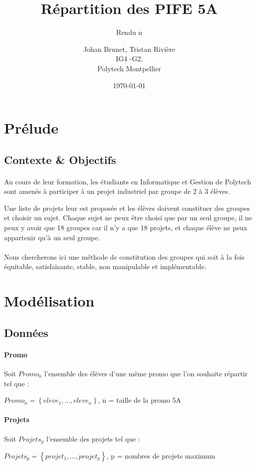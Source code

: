 \documentclass[10pt,a4paper]{scrartcl}
\title{Répartition des PIFE 5A}
\subtitle{Rendu n\degre3}
\author{Johan Brunet, Tristan Rivière\\
   IG4 -G2,\\
   Polytech Montpellier}
\date{\today}
\begin{document}
\maketitle
\section{Prélude}
\subsection{Contexte \& Objectifs}
\paragraph*{}
Au cours de leur formation, les étudiants en Informatique et Gestion de Polytech sont amenés à participer à un projet industriel par groupe de 2 à 3 élèves.

Une liste de projets leur est proposée et les élèves doivent constituer des groupes et choisir un sujet. Chaque sujet ne peux être choisi que par un seul groupe, il ne peux y avoir que 18 groupes car il n'y a que 18 projets, et chaque élève ne peux appartenir qu'à un seul groupe.
\paragraph*{}
Nous chercherons ici une méthode de constitution des groupes qui soit à la fois équitable, satisfaisante, stable, non manipulable et implémentable.

\section{Modélisation}
\subsection{Données}
\paragraph{Promo}Soit $Promo_{n}$ l'ensemble des élèves d'une même promo que l'on souhaite répartir tel que : \\
\begin{center}
	$Promo_{n}=\left\{ eleve_{1}, ..., eleve_{n} \right\}$, n = taille de la promo 5A
\end{center}
\paragraph{Projets}Soit $Projets_{p}$ l'ensemble des projets tel que : \\
\begin{center}
	$Projets_{p}=\left\{ projet_{1}, ..., projet_{p} \right\}$, p = nombres de projets maximum
\end{center}
\end{document}
